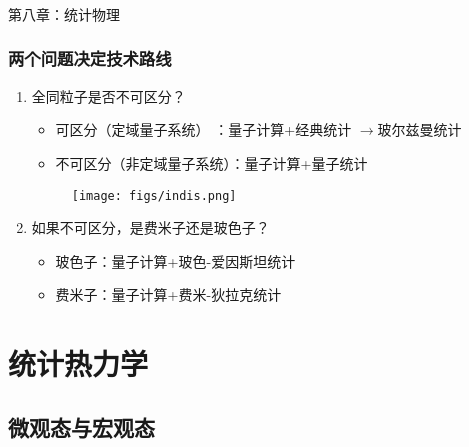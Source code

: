 \begin{frame} [plain]
    \frametitle{}
    \Background[2] 
    \begin{center}
    { {\huge 第八章：统计物理 }}
    \end{center}  
    \addtocounter{framenumber}{-1}   
\end{frame}

\begin{frame}
  \frametitle{两个问题决定技术路线}
  \begin{enumerate}
    \item 全同粒子是否不可区分？
  \begin{itemize}
    \item 可区分（定域量子系统） ：量子计算+经典统计 $\to $玻尔兹曼统计 
    \item 不可区分（非定域量子系统）：量子计算+量子统计
  \end{itemize}
  \begin{figure}[htbp]
    \centering
    \texttt{[image: figs/indis.png]}
  \end{figure}
    \item 如果不可区分，是费米子还是玻色子？
    \begin{itemize}
      \item 玻色子：量子计算+玻色-爱因斯坦统计
      \item 费米子：量子计算+费米-狄拉克统计
    \end{itemize}
  \end{enumerate} 
\end{frame} 

\section{统计热力学 }

\subsection{微观态与宏观态}


